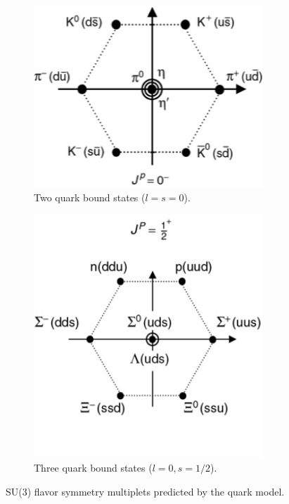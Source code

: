 \begin{figure}
\centering
\begin{subfigure}[c]{0.425\textwidth}
\includegraphics[width=0.95\textwidth]{figs/mesons.png}
\caption{Two quark bound states ($l=s=0$).}
\end{subfigure}
\begin{subfigure}[c]{0.425\textwidth}
\includegraphics[width=0.95\textwidth]{figs/baryons.png}
\caption{Three quark bound states ($l=0, s=1/2$).}
\end{subfigure}
\caption{SU(3) flavor symmetry multiplets predicted by the quark model.}
\label{fig:su3flavor}
\end{figure}

